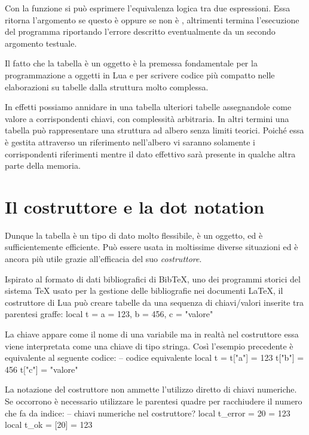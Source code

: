 Con la funzione  si può esprimere l'equivalenza logica tra due
espressioni. Essa ritorna l'argomento se questo è  oppure se non è
, altrimenti termina l'esecuzione del programma riportando l'errore
descritto eventualmente da un secondo argomento testuale.

Il fatto che la tabella è un oggetto è la premessa fondamentale per la
programmazione a oggetti in Lua e per scrivere codice più compatto nelle
elaborazioni su tabelle dalla struttura molto complessa.

In effetti possiamo annidare in una tabella ulteriori tabelle assegnandole come
valore a corrispondenti chiavi, con complessità arbitraria. In altri termini
una tabella può rappresentare una struttura ad albero senza limiti teorici.
Poiché essa è gestita attraverso un riferimento nell'albero vi saranno solamente
i corrispondenti riferimenti mentre il dato effettivo sarà presente in qualche
altra parte della memoria.


\section{Il costruttore e la dot notation}

Dunque la tabella è un tipo di dato molto flessibile, è un oggetto, ed è
sufficientemente efficiente. Può essere usata in moltissime diverse situazioni
ed è ancora più utile grazie all'efficacia del suo \emph{costruttore}.

Ispirato al formato di dati bibliografici di BibTeX, uno dei programmi storici
del sistema \TeX{} usato per la gestione delle bibliografie nei documenti
\LaTeX, il costruttore di Lua può creare tabelle da una sequenza di
chiavi/valori inserite tra parentesi graffe:
\lines
local t = { a = 123, b = 456, c = "valore"}
\endlines
{}

La chiave appare come il nome di una variabile ma in realtà nel costruttore
essa viene interpretata come una chiave di tipo stringa. Così l'esempio
precedente è equivalente al seguente codice:
\lines
-- codice equivalente
local t = {}
t["a"] = 123
t["b"] = 456
t["c"] = "valore"
\endlines
{}

La notazione del costruttore non ammette l'utilizzo diretto di chiavi
numeriche. Se occorrono è necessario utilizzare le parentesi quadre per
racchiudere il numero che fa da indice:
\lines
-- chiavi numeriche nel costruttore?
local t_error = { 20 = 123 }
local t_ok = { [20] = 123 }
\endlines
{}

